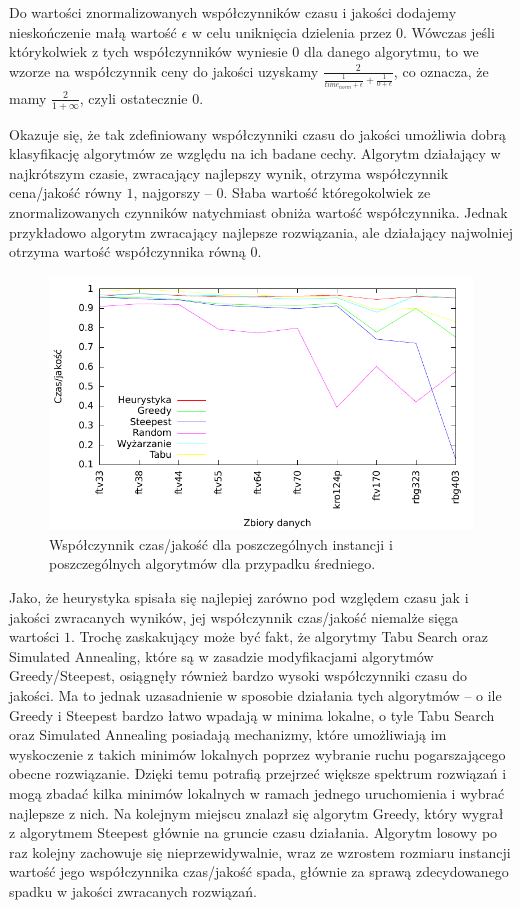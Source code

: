 Do wartości znormalizowanych współczynników czasu i jakości dodajemy nieskończenie małą wartość $\epsilon$ w celu uniknięcia dzielenia przez 0. Wówczas jeśli którykolwiek z tych współczynników wyniesie $0$ dla danego algorytmu, to we wzorze na współczynnik ceny do jakości uzyskamy $\frac{2}{\frac{1}{time_{norm} + \epsilon} + \frac{1}{0 + \epsilon}}$, co oznacza, że mamy $\frac{2}{1 + \infty}$, czyli ostatecznie $0$.

 Okazuje się, że tak zdefiniowany współczynniki czasu do jakości umożliwia dobrą klasyfikację algorytmów ze względu na ich badane cechy. Algorytm działający w najkrótszym czasie, zwracający najlepszy wynik, otrzyma współczynnik cena/jakość równy $1$, najgorszy -- $0$. Słaba wartość któregokolwiek ze znormalizowanych czynników natychmiast obniża wartość współczynnika. Jednak przykładowo algorytm zwracający najlepsze rozwiązania, ale działający najwolniej otrzyma wartość współczynnika równą 0.

\begin{figure}[!h]
\centering\includegraphics[width=12cm]{img/jakosc-czas}
\caption{Współczynnik czas/jakość dla poszczególnych instancji i poszczególnych algorytmów dla przypadku średniego.}\label{rys:czas_jakosc}
\end{figure}

Jako, że heurystyka spisała się najlepiej zarówno pod względem czasu jak i jakości zwracanych wyników, jej współczynnik czas/jakość niemalże sięga wartości $1$. Trochę zaskakujący może być fakt, że algorytmy Tabu Search oraz Simulated Annealing, które są w zasadzie modyfikacjami algorytmów Greedy/Steepest, osiągnęły również bardzo wysoki współczynniki czasu do jakości. Ma to jednak uzasadnienie w sposobie działania tych algorytmów -- o ile Greedy i Steepest bardzo łatwo wpadają w minima lokalne, o tyle Tabu Search oraz Simulated Annealing posiadają mechanizmy, które umożliwiają im wyskoczenie z takich minimów lokalnych poprzez wybranie ruchu pogarszającego obecne rozwiązanie. Dzięki temu potrafią przejrzeć większe spektrum rozwiązań i mogą zbadać kilka minimów lokalnych w ramach jednego uruchomienia i wybrać najlepsze z nich. Na kolejnym miejscu znalazł się algorytm Greedy, który wygrał z algorytmem Steepest głównie na gruncie czasu działania. Algorytm losowy po raz kolejny zachowuje się nieprzewidywalnie, wraz ze wzrostem rozmiaru instancji wartość jego współczynnika czas/jakość spada, głównie za sprawą zdecydowanego spadku w jakości zwracanych rozwiązań.


